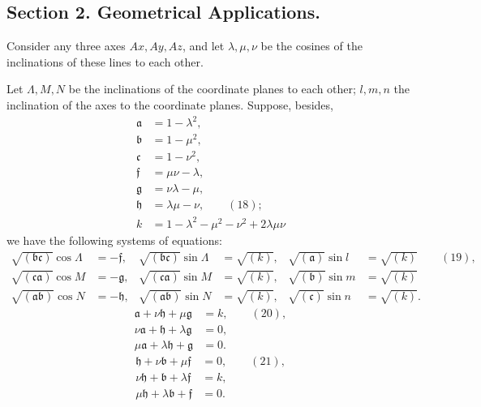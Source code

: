 \documentclass[11pt]{article}
\begin{document}
\newpage
\setcounter{page}{215}

\subsection*{Section 2. Geometrical Applications.}

Consider any three axes $Ax, Ay, Az$, and let $\lambda, \mu, \nu$ be the cosines of the inclinations of these lines to each other.

Let $\Lambda, M, N$ be the inclinations of the coordinate planes to each other; $l, m, n$ the inclination of the axes to the coordinate planes. Suppose, besides,
\begin{align*}
\mathfrak{a} &= 1 - \lambda^2,\\
\mathfrak{b} &= 1 - \mu^2,\\
\mathfrak{c} &= 1 - \nu^2,\\
\mathfrak{f} &= \mu\nu - \lambda,\\
\mathfrak{g} &= \nu\lambda - \mu,\\
\mathfrak{h} &= \lambda\mu - \nu, \qquad (18);\\
k &= 1 - \lambda^2 - \mu^2 - \nu^2 + 2\lambda\mu\nu
\end{align*}
we have the following systems of equations:
\begin{align*}
\sqrt{(\mathfrak{b}\mathfrak{c})}\cos\Lambda &= -\mathfrak{f}, & \sqrt{(\mathfrak{b}\mathfrak{c})}\sin\Lambda &= \sqrt{(k)}, & \sqrt{(\mathfrak{a})}\sin l &= \sqrt{(k)} \qquad (19),\\
\sqrt{(\mathfrak{c}\mathfrak{a})}\cos M &= -\mathfrak{g}, & \sqrt{(\mathfrak{c}\mathfrak{a})}\sin M &= \sqrt{(k)}, & \sqrt{(\mathfrak{b})}\sin m &= \sqrt{(k)}\\
\sqrt{(\mathfrak{a}\mathfrak{b})}\cos N &= -\mathfrak{h}, & \sqrt{(\mathfrak{a}\mathfrak{b})}\sin N &= \sqrt{(k)}, & \sqrt{(\mathfrak{c})}\sin n &= \sqrt{(k)}.
\end{align*}
\begin{align*}
\mathfrak{a} + \nu\mathfrak{h} + \mu\mathfrak{g} &= k, \qquad (20),\\
\nu\mathfrak{a} + \mathfrak{h} + \lambda\mathfrak{g} &= 0,\\
\mu\mathfrak{a} + \lambda\mathfrak{h} + \mathfrak{g} &= 0.
\end{align*}
\begin{align*}
\mathfrak{h} + \nu\mathfrak{b} + \mu\mathfrak{f} &= 0, \qquad (21),\\
\nu\mathfrak{h} + \mathfrak{b} + \lambda\mathfrak{f} &= k,\\
\mu\mathfrak{h} + \lambda\mathfrak{b} + \mathfrak{f} &= 0.
\end{align*}
\end{document}
